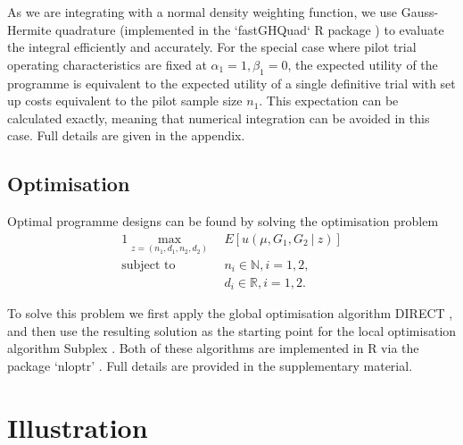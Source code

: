\documentclass[sagev, Crown]{sagej} %
\begin{document}
As we are integrating with a normal density weighting function, we use Gauss-Hermite quadrature (implemented in the `fastGHQuad` R package \cite{Blocker2018}) to evaluate the integral efficiently and accurately. %
For the special case where pilot trial operating characteristics are fixed at $\alpha_1 = 1, \beta_1 = 0$, the expected utility of the programme is equivalent to the expected utility of a single definitive trial with set up costs equivalent to the pilot sample size $n_1$. This expectation can be calculated exactly, meaning that numerical integration can be avoided in this case. Full details are given in the appendix.


\subsection{Optimisation}\label{sec:optimisation}

Optimal programme designs can be found by solving the optimisation problem
\begin{alignat}{1}\label{eqn:opt}
\max_{z = (n_1, d_1, n_2, d_2)} ~ & E[u(\mu, G_1, G_2 ~|~ z)] \\
\text{subject to} ~ & n_i \in \mathbb{N}, i=1,2, \nonumber \\ 
& d_i \in \mathbb{R}, i=1,2. \nonumber
\end{alignat}

To solve this problem we first apply the global optimisation algorithm DIRECT \cite{Jones1993}, and then use the resulting solution as the starting point for the local optimisation algorithm Subplex  \cite{Rowan1990}. Both of these algorithms are implemented in R via the package `nloptr' \cite{Ypma2018}. Full details are provided in the supplementary material.


\section{Illustration}\label{sec:illustration}
\end{document}
